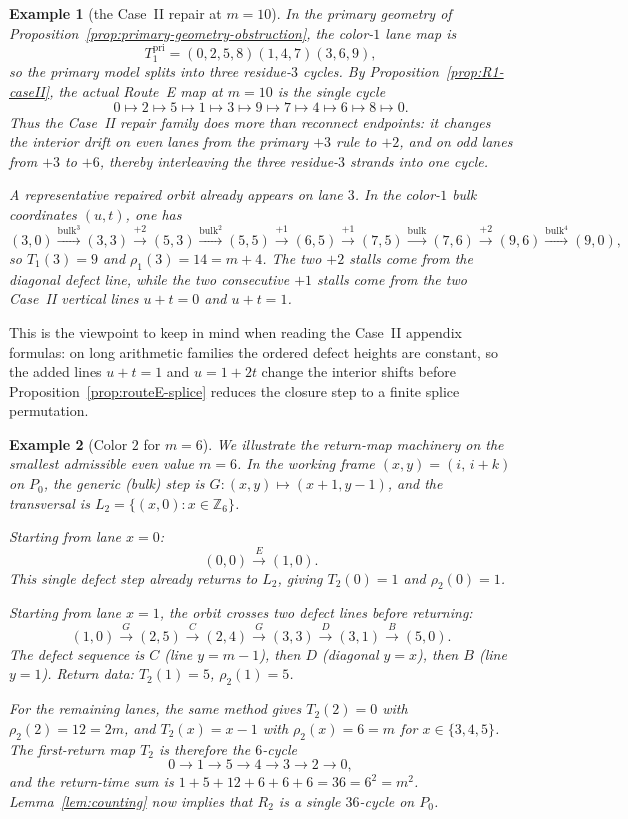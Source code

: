 \documentclass[11pt]{article}
\newtheorem{example}{Example}
\newcommand{\bulk}{\mathrm{bulk}}   %
\begin{document}
\begin{example}[the Case~II repair at $m=10$]\label{ex:m10-color1}
In the primary geometry of Proposition~\ref{prop:primary-geometry-obstruction}, the color-$1$ lane map is
\[
T_1^{\mathrm{pri}}=(0,2,5,8)(1,4,7)(3,6,9),
\]
so the primary model splits into three residue-$3$ cycles.
By Proposition~\ref{prop:R1-caseII}, the actual Route~E map at $m=10$ is the single cycle
\[
0\mapsto 2\mapsto 5\mapsto 1\mapsto 3\mapsto 9\mapsto 7\mapsto 4\mapsto 6\mapsto 8\mapsto 0.
\]
Thus the Case~II repair family does more than reconnect endpoints: it changes the interior drift on even lanes from the primary $+3$ rule to $+2$, and on odd lanes from $+3$ to $+6$, thereby interleaving the three residue-$3$ strands into one cycle.

A representative repaired orbit already appears on lane $3$.
In the color-$1$ bulk coordinates $(u,t)$, one has
\[
(3,0)\xrightarrow{\bulk^3}(3,3)\xrightarrow{+2}(5,3)\xrightarrow{\bulk^2}(5,5)\xrightarrow{+1}(6,5)
\xrightarrow{+1}(7,5)\xrightarrow{\bulk}(7,6)\xrightarrow{+2}(9,6)\xrightarrow{\bulk^4}(9,0),
\]
so $T_1(3)=9$ and $\rho_1(3)=14=m+4$.
The two $+2$ stalls come from the diagonal defect line, while the two consecutive $+1$ stalls come from the two Case~II vertical lines $u+t=0$ and $u+t=1$.
\end{example}

This is the viewpoint to keep in mind when reading the Case~II appendix formulas: on long arithmetic families the ordered defect heights are constant, so the added lines $u+t=1$ and $u=1+2t$ change the interior shifts before Proposition~\ref{prop:routeE-splice} reduces the closure step to a finite splice permutation.

\begin{example}[Color $2$ for $m=6$]\label{ex:m6-color2}
We illustrate the return-map machinery on the smallest admissible even value $m=6$.
In the working frame $(x,y)=(i,\,i+k)$ on $P_0$, the generic (bulk) step is $G\colon(x,y)\mapsto(x+1,y-1)$, and the transversal is $L_2=\{(x,0):x\in\mathbb Z_6\}$.

Starting from lane $x=0$:
\[
(0,0)\xrightarrow{E}(1,0).
\]
This single defect step already returns to $L_2$, giving $T_2(0)=1$ and $\rho_2(0)=1$.

Starting from lane $x=1$, the orbit crosses two defect lines before returning:
\[
(1,0)\xrightarrow{G}(2,5)\xrightarrow{C}(2,4)\xrightarrow{G}(3,3)
\xrightarrow{D}(3,1)\xrightarrow{B}(5,0).
\]
The defect sequence is $C$ (line $y=m{-}1$), then $D$ (diagonal $y=x$), then $B$ (line $y=1$).
Return data: $T_2(1)=5$, $\rho_2(1)=5$.

For the remaining lanes, the same method gives $T_2(2)=0$ with $\rho_2(2)=12=2m$, and $T_2(x)=x-1$ with $\rho_2(x)=6=m$ for $x\in\{3,4,5\}$.
The first-return map $T_2$ is therefore the $6$-cycle
\[
0\to 1\to 5\to 4\to 3\to 2\to 0,
\]
and the return-time sum is $1+5+12+6+6+6=36=6^2=m^2$.
Lemma~\ref{lem:counting} now implies that $R_2$ is a single $36$-cycle on $P_0$.
\end{example}
\end{document}
